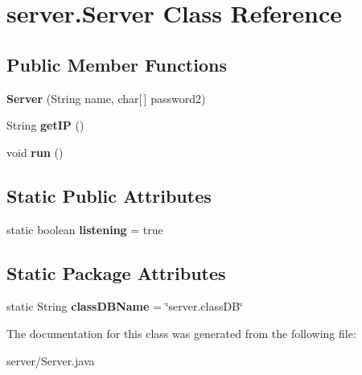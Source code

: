 \hypertarget{classserver_1_1_server}{
\section{server.\-Server \-Class \-Reference}
\label{classserver_1_1_server}
}
\subsection*{\-Public \-Member \-Functions}
\begin{DoxyCompactItemize}
\item 
\hypertarget{classserver_1_1_server_a43ef17688ed103669d42c56dcd329c59}{
{\bfseries \-Server} (\-String name, char\mbox{[}$\,$\mbox{]} password2)}
\label{classserver_1_1_server_a43ef17688ed103669d42c56dcd329c59}

\item 
\hypertarget{classserver_1_1_server_a4b245083bdeac2fe5f9a5cea30f5f0b7}{
\-String {\bfseries get\-I\-P} ()}
\label{classserver_1_1_server_a4b245083bdeac2fe5f9a5cea30f5f0b7}

\item 
\hypertarget{classserver_1_1_server_a803f3b2a096f160a4070a55085f98c2e}{
void {\bfseries run} ()}
\label{classserver_1_1_server_a803f3b2a096f160a4070a55085f98c2e}

\end{DoxyCompactItemize}
\subsection*{\-Static \-Public \-Attributes}
\begin{DoxyCompactItemize}
\item 
\hypertarget{classserver_1_1_server_a4f1c9b02c0f11c623eb28a25432c5a72}{
static boolean {\bfseries listening} = true}
\label{classserver_1_1_server_a4f1c9b02c0f11c623eb28a25432c5a72}

\end{DoxyCompactItemize}
\subsection*{\-Static \-Package \-Attributes}
\begin{DoxyCompactItemize}
\item 
\hypertarget{classserver_1_1_server_aad49f14f8a85432e4c64075b65ad3833}{
static \-String {\bfseries class\-D\-B\-Name} = \char`\"{}server.\-class\-D\-B\char`\"{}}
\label{classserver_1_1_server_aad49f14f8a85432e4c64075b65ad3833}

\end{DoxyCompactItemize}


\-The documentation for this class was generated from the following file\-:\begin{DoxyCompactItemize}
\item 
server/\-Server.\-java\end{DoxyCompactItemize}
